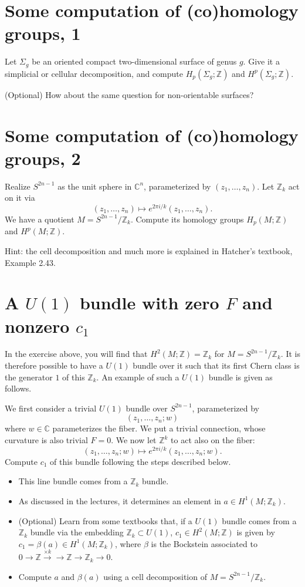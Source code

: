 \documentclass[11pt,a4paper]{article}
\def\bC{\mathbb{C}}
\def\bZ{\mathbb{Z}}
\begin{document}
\section{Some computation of (co)homology groups, 1}

Let $\Sigma_g$ be an oriented compact two-dimensional surface of genus $g$.
Give it a simplicial or cellular decomposition,
and compute $H_p(\Sigma_g;\bZ)$ and $H^p(\Sigma_g;\bZ)$.

(Optional) How about the same question for non-orientable surfaces?

\section{Some computation of (co)homology groups, 2}

Realize $S^{2n-1}$ as the unit sphere in $\bC^n$, parameterized by $(z_1,\ldots,z_n)$.
Let $\bZ_k$ act on it via 
\[
(z_1,\ldots,z_n)\mapsto e^{2\pi i/k} (z_1,\ldots, z_n).
\]
We have a quotient $M=S^{2n-1}/\bZ_k$.
Compute its homology groups $H_p(M;\bZ)$ and $H^p(M;\bZ)$.

Hint: the cell decomposition and much more is explained in Hatcher's textbook, Example 2.43.

\section{A $U(1)$ bundle with zero $F$ and nonzero $c_1$}

In the exercise above, you will find that $H^2(M;\bZ)=\bZ_k$ for $M=S^{2n-1}/\bZ_k$.
It is therefore possible to have a $U(1)$ bundle over it such that its first Chern class is the generator $1$ of this $\bZ_k$.
An example of such a $U(1)$ bundle is given as follows.

We first consider a trivial $U(1)$ bundle over $S^{2n-1}$, parameterized by \[
(z_1,\ldots,z_n;w)
\] where $w\in \bC$ parameterizes the fiber. 
We put a trivial connection, whose  curvature is also trivial $F=0$.
We now let $\bZ^k$ to act also on the fiber: \[
(z_1,\ldots,z_n;w)\mapsto e^{2\pi i/k} (z_1,\ldots, z_n;w).
\]
Compute $c_1$ of this bundle  following the steps described below.
\begin{itemize}
\item This line bundle comes from a $\bZ_k$ bundle.
\item As discussed in the lectures, it determines an element in $a\in H^1(M;\bZ_k)$.
\item (Optional) Learn from some textbooks that, if a $U(1)$ bundle comes from a $\bZ_k$ bundle via 
the embedding $\bZ_k \subset U(1)$, 
$c_1\in H^2(M;\bZ)$ is given by $c_1=\beta(a)\in H^1(M;\bZ_k)$,
where $\beta$ is the Bockstein associated to $0\to\bZ \xrightarrow{\times k}\to \bZ\to \bZ_k\to 0$.
\item Compute $a$ and $\beta(a)$ using a cell decomposition of $M=S^{2n-1}/\bZ_k$.
\end{itemize}
\end{document}
